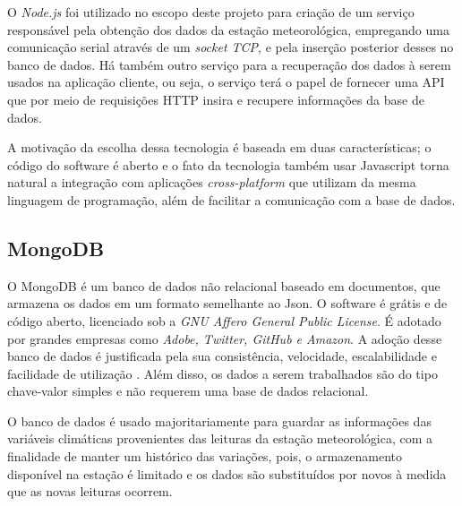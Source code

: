 O \textit{Node.js} foi utilizado no escopo deste projeto para criação de um serviço responsável pela obtenção dos dados da estação meteorológica, empregando uma comunicação serial através de um \textit{socket TCP}, e pela inserção posterior desses no banco de dados. Há também outro serviço para a recuperação dos dados à serem usados na aplicação cliente, ou seja, o serviço terá o papel de fornecer uma API que por meio de requisições HTTP insira e recupere informações da base de dados.

A motivação da escolha dessa tecnologia é baseada em duas características; o código do software é aberto e o fato da tecnologia também usar Javascript torna natural a integração com aplicações \textit{cross-platform} que utilizam da mesma linguagem de programação, além de facilitar a comunicação com a base de dados.


\subsection{MongoDB} \label{subsec:MongoDB}

O MongoDB é um banco de dados não relacional baseado em documentos, que armazena os dados em um formato semelhante ao Json. O software é grátis e de código aberto, licenciado sob a \textit{GNU Affero General Public License}. É adotado por grandes empresas como \textit{Adobe, Twitter, GitHub e Amazon}. A adoção desse banco de dados é justificada pela sua consistência, velocidade, escalabilidade e facilidade de utilização \cite{SITEMONGODB}. Além disso, os dados a serem trabalhados são do tipo chave-valor simples e não requerem uma base de dados relacional.

O banco de dados é usado majoritariamente para guardar as informações das variáveis climáticas provenientes das leituras da estação meteorológica, com a finalidade de manter um histórico das variações, pois, o armazenamento disponível na estação é limitado e os dados são substituídos por novos à medida que as novas leituras ocorrem.





